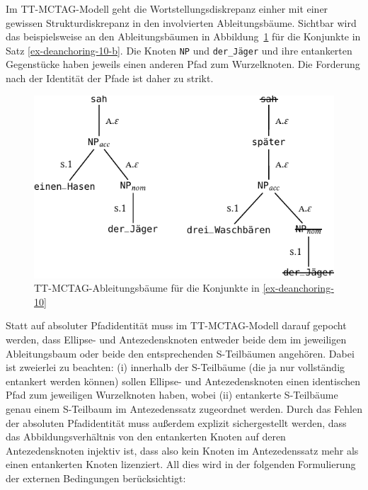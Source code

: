 Im TT-MCTAG-Modell geht die Wortstellungsdiskrepanz einher mit einer gewissen Strukturdiskrepanz in den involvierten Ableitungsbäume. Sichtbar wird das beispielsweise an den Ableitungsbäumen in Abbildung~\ref{fig-deanchoring-12} für die Konjunkte in Satz \ref{ex-deanchoring-10-b}. Die Knoten {\tt NP\subnom} und {\tt der\_Jäger} und ihre entankerten Gegenstücke haben jeweils einen anderen Pfad zum Wurzelknoten. Die Forderung nach der Identität der Pfade ist daher zu strikt. 
\begin{figure}[t]
\centering
\includegraphics{graphics/abb829.pdf}
\caption{\label{fig-deanchoring-12}TT-MCTAG-Ableitungsbäume für die Konjunkte in \ref{ex-deanchoring-10}}
\end{figure}
Statt auf absoluter Pfadidentität muss im TT-MCTAG-Modell darauf gepocht werden, dass Ellipse- und Antezedensknoten entweder beide dem  im jeweiligen Ableitungsbaum oder beide den entsprechenden S-Teilbäumen angehören. Dabei ist zweierlei zu beachten: (i) innerhalb der S-Teilbäume (die ja nur vollständig entankert werden können) sollen Ellipse- und Antezedensknoten einen identischen Pfad zum jeweiligen Wurzelknoten haben, wobei (ii) entankerte S-Teilbäume genau einem S-Teilbaum im Antezedenssatz zugeordnet werden. Durch das Fehlen der absoluten Pfadidentität muss au\ss erdem explizit sichergestellt werden, dass das Abbildungsverhältnis von den entankerten Knoten auf deren Antezedensknoten injektiv ist, dass also kein Knoten im Antezedenssatz mehr als einen entankerten Knoten lizenziert. All dies wird in der folgenden Formulierung der externen Bedingungen berücksichtigt:  

